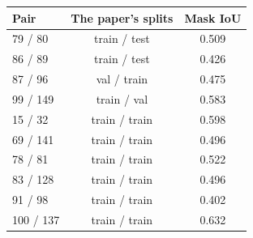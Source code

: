 \begin{tabular}{lcc}
\toprule
Pair & The paper's splits & Mask IoU \\
\midrule
79 / 80 & train / test & 0.509 \\
86 / 89 & train / test & 0.426 \\
87 / 96 & val / train & 0.475 \\
99 / 149 & train / val & 0.583 \\
15 / 32 & train / train & 0.598 \\
69 / 141 & train / train & 0.496 \\
78 / 81 & train / train & 0.522 \\
83 / 128 & train / train & 0.496 \\
91 / 98 & train / train & 0.402 \\
100 / 137 & train / train & 0.632 \\
\bottomrule
\end{tabular}
